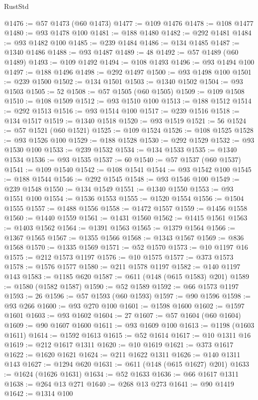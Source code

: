 \begin{lexlean}{RustStd}
\begin{coremodule}
@1476 := @57 @1473 (@60 @1473)
@1477 := @109 @1476
@1478 := @108 @1477
@1480 := @93 @1478 @100
@1481 := @188 @1480
@1482 := @292 @1481
@1484 := @93 @1482 @100
@1485 := @239 @1484
@1486 := @134 @1485
@1487 := @1340 @1486
@1488 := @93 @1487
@1489 := 48
@1492 := @57 @1489 (@60 @1489)
@1493 := @109 @1492
@1494 := @108 @1493
@1496 := @93 @1494 @100
@1497 := @188 @1496
@1498 := @292 @1497
@1500 := @93 @1498 @100
@1501 := @239 @1500
@1502 := @134 @1501
@1503 := @1340 @1502
@1504 := @93 @1503
@1505 := 52
@1508 := @57 @1505 (@60 @1505)
@1509 := @109 @1508
@1510 := @108 @1509
@1512 := @93 @1510 @100
@1513 := @188 @1512
@1514 := @292 @1513
@1516 := @93 @1514 @100
@1517 := @239 @1516
@1518 := @134 @1517
@1519 := @1340 @1518
@1520 := @93 @1519
@1521 := 56
@1524 := @57 @1521 (@60 @1521)
@1525 := @109 @1524
@1526 := @108 @1525
@1528 := @93 @1526 @100
@1529 := @188 @1528
@1530 := @292 @1529
@1532 := @93 @1530 @100
@1533 := @239 @1532
@1534 := @134 @1533
@1535 := @1340 @1534
@1536 := @93 @1535
@1537 := 60
@1540 := @57 @1537 (@60 @1537)
@1541 := @109 @1540
@1542 := @108 @1541
@1544 := @93 @1542 @100
@1545 := @188 @1544
@1546 := @292 @1545
@1548 := @93 @1546 @100
@1549 := @239 @1548
@1550 := @134 @1549
@1551 := @1340 @1550
@1553 := @93 @1551 @100
@1554 := @1536 @1553
@1555 := @1520 @1554
@1556 := @1504 @1555
@1557 := @1488 @1556
@1558 := @1472 @1557
@1559 := @1456 @1558
@1560 := @1440 @1559
@1561 := @1431 @1560
@1562 := @1415 @1561
@1563 := @1403 @1562
@1564 := @1391 @1563
@1565 := @1379 @1564
@1566 := @1367 @1565
@1567 := @1355 @1566
@1568 := @1343 @1567
@1569 := @836 @1568
@1570 := @1335 @1569
@1571 := @52 @1570
@1573 := @10 @1197 @16
@1575 := @212 @1573 @1197
@1576 := @10 @1575
@1577 := @373 @1573
@1578 := @1576 @1577
@1580 := @211 @1578 @1197
@1582 := @140 @1197 @143
@1583 := @1185 @620
@1587 := @611 (@148 (@615 @1583) @201)
@1589 := @1580 (@1582 @1587)
@1590 := @52 @1589
@1592 := @66 @1573 @1197
@1593 := 26
@1596 := @57 @1593 (@60 @1593)
@1597 := @90 @1596
@1598 := @93 @266
@1600 := @93 @270 @100
@1601 := @1598 @1600
@1602 := @1597 @1601
@1603 := @93 @1602
@1604 := 27
@1607 := @57 @1604 (@60 @1604)
@1609 := @90 @1607 @1600
@1611 := @93 @1609 @100
@1613 := @1198 (@1603 @1611)
@1614 := @1592 @1613
@1615 := @52 @1614
@1617 := @10 @1311 @16
@1619 := @212 @1617 @1311
@1620 := @10 @1619
@1621 := @373 @1617
@1622 := @1620 @1621
@1624 := @211 @1622 @1311
@1626 := @140 @1311 @143
@1627 := @1294 @620
@1631 := @611 (@148 (@615 @1627) @201)
@1633 := @1624 (@1626 @1631)
@1634 := @52 @1633
@1636 := @66 @1617 @1311
@1638 := @264 @13 @271
@1640 := @268 @13 @273
@1641 := @90 @1419
@1642 := @1314 @100

\end{coremodule}
\end{lexlean}
